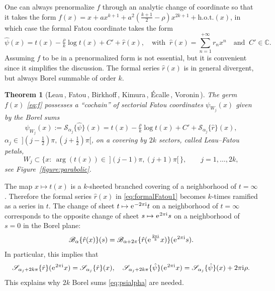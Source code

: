 \documentclass[a4paper,11pt]{amsart}
\numberwithin{equation}{section}
\newcommand{\hot}{\mathrm{h.o.t.}}
\renewcommand{\i}{\mathrm{i}\mkern.25\thinmuskip}
\newcommand{\e}{\ensuremath{\mkern.25\thinmuskip\mathrm{e}\mkern.4\thinmuskip}}
\newcommand{\Borel}{\mathscr{B}}
\newcommand{\BSum}{\mathscr{S}}
\newtheorem{theorem}{Theorem}
\theoremstyle{definition}
\begin{document}
One can always prenormalize $f$ through an analytic change of coordinate so that it takes the form $f(x)=x+ax^{k+1}+a^2(\tfrac{k+1}{2}-\rho)x^{2k+1}+\hot(x)$,
in which case the formal Fatou coordinate takes the form
\begin{equation}\label{eq:formalFatou1}
 \hat\psi(x)=t(x)-\tfrac{\rho}{k}\log t(x)+C'+\hat r(x), \quad
 \text{with }\ \hat r(x)=\sum_{n=1}^{+\infty}r_nx^n\quad \text{and }\ C'\in\mathbb C. 
\end{equation}
Assuming $f$ to be in a prenormalized form is not essential, but it is convenient since it simplifies the discussion.
The formal series $\hat r(x)$ is in general divergent, but always Borel summable of order $k$.



\begin{theorem}[Leau\,\cite{Leau}, Fatou\,\cite{Fatou}, Birkhoff\,\cite{Birkhoff}, Kimura\,\cite{Kimura}, \'Ecalle\,\cite{Ecalle}, Voronin\,\cite{Voronin}] \label{thm:sectorialFatou}
The germ $f(x)$ \eqref{eq:f} possesses a  \emph{``cochain'' of sectorial Fatou coordinates} $\psi_{W_j}(x)$ given by the Borel sums
\begin{equation}\label{eq:psialpha}
	\psi_{W_j}(x):=\BSum_{\alpha_j}\{\hat\psi\}(x)=t(x)-\tfrac{\rho}{k}\log t(x)+C'+\BSum_{\alpha_j}\{\hat r\}(x),  
\end{equation}
$\alpha_j\in\  ](j-\tfrac12)\pi,(j+\tfrac12)\pi[$, on a covering by $2k$ sectors, called \emph{Leau--Fatou petals},
\[W_{j}\subset\big\{x:\ \arg(t(x))\in\ ](j-1)\pi,(j+1)\pi[\,\big\},\qquad j=1,\ldots,2k,\]
see Figure~\ref{figure:parabolic}. 
\end{theorem}


The map $x\mapsto t(x)$ is a $k$-sheeted branched covering of a neighborhood of $t=\infty$.
Therefore the formal series $\hat r(x)$ in \eqref{eq:formalFatou1} becomes $k$-times ramified as a series in $t$.
The change of sheet $t\mapsto \e^{-2\pi\i}t$ on a neighborhood of $t=\infty$ corresponds to the opposite change of sheet $s\mapsto \e^{2\pi\i}s$ on a neighborhood of $s=0$ in the Borel plane:
\[\Borel_\alpha\{\hat r(x)\}(s)=\Borel_{\alpha+2\pi}\{\hat r(\e^{\frac{2\pi\i}{k}}x)\}(\e^{2\pi\i}s).\]
In particular, this implies that
\[\BSum_{\alpha_j+2k\pi}\{\hat r\}(\e^{2\pi\i }x)=\BSum_{\alpha_j}\{\hat r\}(x),\quad \BSum_{\alpha_j+2k\pi}\{\hat\psi\}(\e^{2\pi\i }x)=\BSum_{\alpha_j}\{\hat \psi\}(x)+2\pi\i \rho.\]
This explains why $2k$ Borel sums \eqref{eq:psialpha} are needed.
\end{document}
